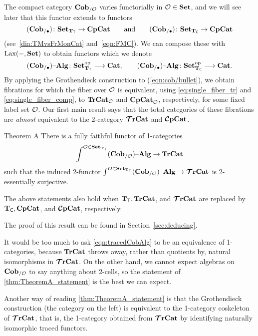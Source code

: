 \documentclass[11pt,oneside,article]{memoir}
\begin{document}
The compact category $\mathbf{Cob}_{/\mathcal{O}}$ varies functorially in $\mathcal{O}\in\mathbf{Set}$, and we will see later
that this functor extends to functors
\begin{equation*}
   (\mathbf{Cob}_{/\bullet})\colon\mathbf{Set}_{\mathbf{T}_{\mathsf{T}}}\to\mathbf{CpCat}\qquad\textnormal{and}
   \qquad
   (\mathbf{Cob}_{/\bullet})\colon\mathbf{Set}_{\mathbf{T}_{\mathsf{C}}}\to\mathbf{CpCat}
\end{equation*}
(see~\eqref{dia:TMvsFrMonCat} and~\eqref{eqn:FMC}). We can compose these with $\operatorname{Lax}(-,\mathbf{Set})$ to
obtain functors which we denote
\begin{equation}\label{eqn:cob/bullet}
   (\mathbf{Cob}_{/\bullet}){\text \textendash}\mathbf{Alg}\colon\mathbf{Set}_{\mathbf{T}_{\mathsf{T}}}^{\mathrm{op}}\longrightarrow\mathbf{Cat},
   \qquad
   (\mathbf{Cob}_{/\bullet}){\text \textendash}\mathbf{Alg}\colon\mathbf{Set}_{\mathbf{T}_{\mathsf{C}}}^{\mathrm{op}}\longrightarrow\mathbf{Cat}.
\end{equation}
By applying the Grothendieck construction to (\ref{eqn:cob/bullet}), we obtain fibrations for which
the fiber over $\mathcal{O}$ is equivalent, using \eqref{eq:single_fiber_tr} and
\eqref{eq:single_fiber_comp}, to $\mathbf{TrCat}_{\mathcal{O}}$ and $\mathbf{CpCat}_{\mathcal{O}}$, respectively, for some
fixed label set $\mathcal{O}$. Our first main result says that the total categories of these fibrations
are \emph{almost} equivalent to the 2-category $\bm{\mathcal{T}}\mathbf{rCat}$ and $\bm{\mathcal{C}}\mathbf{pCat}$.

\begin{named}{Theorem A}\label{thm:TheoremA_statement}
  There is a fully faithful functor of 1-categories
  \begin{equation}\label{eqn:tracedCobAlg}
     \int^{\mathcal{O}\in\mathbf{Set}_{\mathbf{T}_{\mathsf{T}}}}(\mathbf{Cob}_{/\mathcal{O}}){\text \textendash}\mathbf{Alg} \to \mathbf{TrCat}
  \end{equation}
  such that the induced 2-functor $\int^{\mathcal{O}\in\mathbf{Set}_{\mathbf{T}_{\mathsf{T}}}}(\mathbf{Cob}_{/\mathcal{O}}){\text \textendash}\mathbf{Alg}\to\bm{\mathcal{T}}\mathbf{rCat}$ is
  2-essentially surjective.

  The above statements also hold when $\mathbf{T}_{\mathsf{T}}, \mathbf{TrCat}$, and $\bm{\mathcal{T}}\mathbf{rCat}$ are replaced by $\mathbf{T}_{\mathsf{C}}, \mathbf{CpCat}$,
  and $\bm{\mathcal{C}}\mathbf{pCat}$, respectively.
\end{named}

The proof of this result can be found in Section~\ref{sec:deducing}.

\begin{remark}
   It would be too much to ask \eqref{eqn:tracedCobAlg} to be an equivalence of 1-categories,
   because $\mathbf{TrCat}$ throws away, rather than quotients by, natural isomorphisms in $\bm{\mathcal{T}}\mathbf{rCat}$. On the
   other hand, we cannot expect algebras on $\mathbf{Cob}_{/\mathcal{O}}$ to say anything about 2-cells, so the
   statement of \ref{thm:TheoremA_statement} is the best we can expect.

   Another way of reading \ref{thm:TheoremA_statement} is that the Grothendieck construction (the
   category on the left) is equivalent to the 1-category coskeleton of $\bm{\mathcal{T}}\mathbf{rCat}$, that is, the
   1-category obtained from $\bm{\mathcal{T}}\mathbf{rCat}$ by identifying naturally isomorphic traced functors.
\end{remark}
\end{document}
